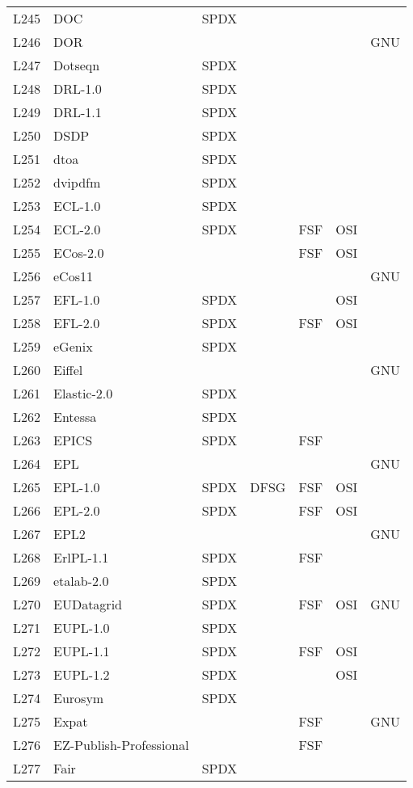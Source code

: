\begin{longtable}[h]{m{2cm} | m{7cm} | c | c | c | c | c}
  L245 & DOC & SPDX &  &  &  &  \\
  L246 & DOR &  &  &  &  & GNU \\
  L247 & Dotseqn & SPDX &  &  &  &  \\
  L248 & DRL-1.0 & SPDX &  &  &  &  \\
  L249 & DRL-1.1 & SPDX &  &  &  &  \\
  L250 & DSDP & SPDX &  &  &  &  \\
  L251 & dtoa & SPDX &  &  &  &  \\
  L252 & dvipdfm & SPDX &  &  &  &  \\
  L253 & ECL-1.0 & SPDX &  &  &  &  \\
  L254 & ECL-2.0 & SPDX &  & FSF & OSI &  \\
  L255 & ECos-2.0 &  &  & FSF & OSI &  \\
  L256 & eCos11 &  &  &  &  & GNU \\
  L257 & EFL-1.0 & SPDX &  &  & OSI &  \\
  L258 & EFL-2.0 & SPDX &  & FSF & OSI &  \\
  L259 & eGenix & SPDX &  &  &  &  \\
  L260 & Eiffel &  &  &  &  & GNU \\
  L261 & Elastic-2.0 & SPDX &  &  &  &  \\
  L262 & Entessa & SPDX &  &  &  &  \\
  L263 & EPICS & SPDX &  & FSF &  &  \\
  L264 & EPL &  &  &  &  & GNU \\
  L265 & EPL-1.0 & SPDX & DFSG & FSF & OSI &  \\
  L266 & EPL-2.0 & SPDX &  & FSF & OSI &  \\
  L267 & EPL2 &  &  &  &  & GNU \\
  L268 & ErlPL-1.1 & SPDX &  & FSF &  &  \\
  L269 & etalab-2.0 & SPDX &  &  &  &  \\
  L270 & EUDatagrid & SPDX &  & FSF & OSI & GNU \\
  L271 & EUPL-1.0 & SPDX &  &  &  &  \\
  L272 & EUPL-1.1 & SPDX &  & FSF & OSI &  \\
  L273 & EUPL-1.2 & SPDX &  &  & OSI &  \\
  L274 & Eurosym & SPDX &  &  &  &  \\
  L275 & Expat &  &  & FSF &  & GNU \\
  L276 & EZ-Publish-Professional &  &  & FSF &  &  \\
  L277 & Fair & SPDX &  &  &  &  \\

\end{longtable}
